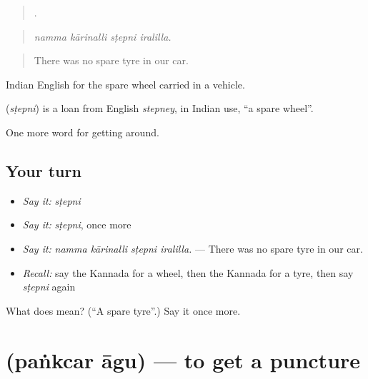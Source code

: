 \begin{quote}
   .
\end{quote}

\begin{quote}
\emph{namma kārinalli sṭepni iralilla.}
\end{quote}

\begin{quote}
There was no spare tyre in our car.
\end{quote}

Indian English for the spare wheel carried in a vehicle.

\begin{cousinweb}
\textbf{} (\emph{sṭepni}) is a loan from English \emph{stepney}, in Indian use, \textquotedblleft{}a spare wheel\textquotedblright{}.
\end{cousinweb}

\begin{grammarlens}[title={What you've built}]
One more word for getting around.
\end{grammarlens}

\subsection*{Your turn}
\begin{itemize}
\raggedright
  \item \emph{Say it:} \emph{sṭepni}
  \item \emph{Say it:} \emph{sṭepni}, once more
  \item \emph{Say it:} \emph{namma kārinalli sṭepni iralilla.} — There was no spare tyre in our car.
  \item \emph{Recall:} say the Kannada for a wheel, then the Kannada for a tyre, then say \emph{sṭepni} again
\end{itemize}

\begin{tcolorbox}[breakable,colback=teal!4,colframe=teal!35!black,title={Before you move on}]
What does  mean? (\textquotedblleft{}A spare tyre\textquotedblright{}.) Say it once more.
\end{tcolorbox}
\section[\texorpdfstring{\kn{ಪಂಕ್ಚರ್} \kn{ಆಗು} (paṅkcar āgu)}{ಪಂಕ್ಚರ್ ಆಗು (paṅkcar āgu)}]{  (paṅkcar āgu) — to get a puncture}

